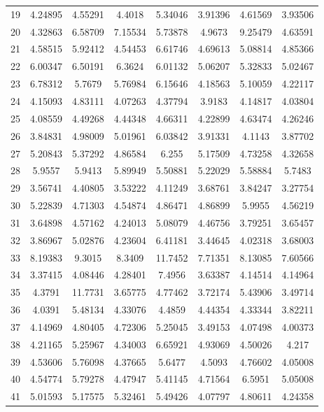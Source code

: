 \begin{center}
\begin{longtable}{cccccccc}
19 & 4.24895 & 4.55291 & 4.4018 & 5.34046 & 3.91396 & 4.61569 & 3.93506\\
20 & 4.32863 & 6.58709 & 7.15534 & 5.73878 & 4.9673 & 9.25479 & 4.63591\\
21 & 4.58515 & 5.92412 & 4.54453 & 6.61746 & 4.69613 & 5.08814 & 4.85366\\
22 & 6.00347 & 6.50191 & 6.3624 & 6.01132 & 5.06207 & 5.32833 & 5.02467\\
23 & 6.78312 & 5.7679 & 5.76984 & 6.15646 & 4.18563 & 5.10059 & 4.22117\\
24 & 4.15093 & 4.83111 & 4.07263 & 4.37794 & 3.9183 & 4.14817 & 4.03804\\
25 & 4.08559 & 4.49268 & 4.44348 & 4.66311 & 4.22899 & 4.63474 & 4.26246\\
26 & 3.84831 & 4.98009 & 5.01961 & 6.03842 & 3.91331 & 4.1143 & 3.87702\\
27 & 5.20843 & 5.37292 & 4.86584 & 6.255 & 5.17509 & 4.73258 & 4.32658\\
28 & 5.9557 & 5.9413 & 5.89949 & 5.50881 & 5.22029 & 5.58884 & 5.7483\\
29 & 3.56741 & 4.40805 & 3.53222 & 4.11249 & 3.68761 & 3.84247 & 3.27754\\
30 & 5.22839 & 4.71303 & 4.54874 & 4.86471 & 4.86899 & 5.9955 & 4.56219\\
31 & 3.64898 & 4.57162 & 4.24013 & 5.08079 & 4.46756 & 3.79251 & 3.65457\\
32 & 3.86967 & 5.02876 & 4.23604 & 6.41181 & 3.44645 & 4.02318 & 3.68003\\
33 & 8.19383 & 9.3015 & 8.3409 & 11.7452 & 7.71351 & 8.13085 & 7.60566\\
34 & 3.37415 & 4.08446 & 4.28401 & 7.4956 & 3.63387 & 4.14514 & 4.14964\\
35 & 4.3791 & 11.7731 & 3.65775 & 4.77462 & 3.72174 & 5.43906 & 3.49714\\
36 & 4.0391 & 5.48134 & 4.33076 & 4.4859 & 4.44354 & 4.33344 & 3.82211\\
37 & 4.14969 & 4.80405 & 4.72306 & 5.25045 & 3.49153 & 4.07498 & 4.00373\\
38 & 4.21165 & 5.25967 & 4.34003 & 6.65921 & 4.93069 & 4.50026 & 4.217\\
39 & 4.53606 & 5.76098 & 4.37665 & 5.6477 & 4.5093 & 4.76602 & 4.05008\\
40 & 4.54774 & 5.79278 & 4.47947 & 5.41145 & 4.71564 & 6.5951 & 5.05008\\
41 & 5.01593 & 5.17575 & 5.32461 & 5.49426 & 4.07797 & 4.80611 & 4.24358\\

\end{longtable}
\end{center}
